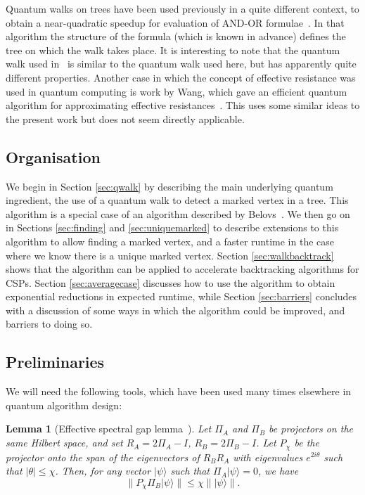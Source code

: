 \documentclass[11pt]{article}
\newcommand{\ket}[1]{| #1 \rangle}
\newtheorem{lem}[thm]{Lemma}
\begin{document}
Quantum walks on trees have been used previously in a quite different context, to obtain a near-quadratic speedup for evaluation of AND-OR formulae~\cite{ambainis10b}. In that algorithm the structure of the formula (which is known in advance) defines the tree on which the walk takes place. It is interesting to note that the quantum walk used in~\cite{ambainis10b} is similar to the quantum walk used here, but has apparently quite different properties. Another case in which the concept of effective resistance was used in quantum computing is work by Wang, which gave an efficient quantum algorithm for approximating effective resistances~\cite{wang13}. This uses some similar ideas to the present work but does not seem directly applicable.


\subsection{Organisation}

We begin in Section \ref{sec:qwalk} by describing the main underlying quantum ingredient, the use of a quantum walk to detect a marked vertex in a tree. This algorithm is a special case of an algorithm described by Belovs~\cite{belovs13}. We then go on in Sections \ref{sec:finding} and \ref{sec:uniquemarked} to describe extensions to this algorithm to allow finding a marked vertex, and a faster runtime in the case where we know there is a unique marked vertex. Section \ref{sec:walkbacktrack} shows that the algorithm can be applied to accelerate backtracking algorithms for CSPs. Section \ref{sec:averagecase} discusses how to use the algorithm to obtain exponential reductions in expected runtime, while Section \ref{sec:barriers} concludes with a discussion of some ways in which the algorithm could be improved, and barriers to doing so.


\subsection{Preliminaries}

We will need the following tools, which have been used many times elsewhere in quantum algorithm design:

\begin{lem}[Effective spectral gap lemma~\cite{lee11}]
\label{lem:effsg}
Let $\Pi_A$ and $\Pi_B$ be projectors on the same Hilbert space, and set $R_A = 2\Pi_A - I$, $R_B = 2\Pi_B-I$. Let $P_\chi$ be the projector onto the span of the eigenvectors of $R_B R_A$ with eigenvalues $e^{2i \theta}$ such that $|\theta| \le \chi$. Then, for any vector $\ket{\psi}$ such that $\Pi_A \ket{\psi} = 0$, we have
%
\[ \|P_\chi \Pi_B \ket{\psi} \| \le \chi \|\ket{\psi} \|. \]
\end{lem}
\end{document}

